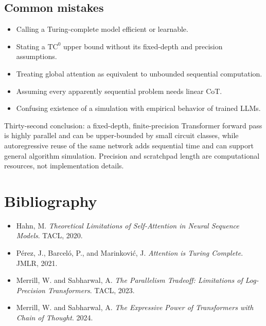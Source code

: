 \documentclass[11pt,a4paper,oneside,openany]{memoir}
\theoremstyle{definition}
\begin{document}
\section{Common mistakes}
\begin{itemize}
\item Calling a Turing-complete model efficient or learnable.
\item Stating a $\mathrm{TC}^0$ upper bound without its fixed-depth and precision assumptions.
\item Treating global attention as equivalent to unbounded sequential computation.
\item Assuming every apparently sequential problem needs linear CoT.
\item Confusing existence of a simulation with empirical behavior of trained LLMs.
\end{itemize}

\begin{presentbox}
Thirty-second conclusion: a fixed-depth, finite-precision Transformer forward pass is highly parallel and can be upper-bounded by small circuit classes, while autoregressive reuse of the same network adds sequential time and can support general algorithm simulation.  Precision and scratchpad length are computational resources, not implementation details.
\end{presentbox}

\chapter*{Bibliography}
\begin{itemize}
\item Hahn, M. \emph{Theoretical Limitations of Self-Attention in Neural Sequence Models}. TACL, 2020.
\item P\'erez, J., Barcel\'o, P., and Marinkovi\'c, J. \emph{Attention is Turing Complete}. JMLR, 2021.
\item Merrill, W. and Sabharwal, A. \emph{The Parallelism Tradeoff: Limitations of Log-Precision Transformers}. TACL, 2023.
\item Merrill, W. and Sabharwal, A. \emph{The Expressive Power of Transformers with Chain of Thought}. 2024.
\end{itemize}
\end{document}
